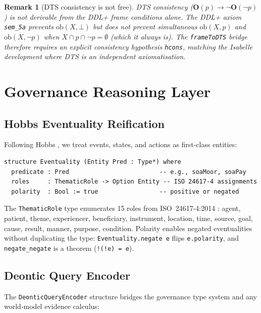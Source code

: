 \documentclass[]{article}
\newtheorem{remark}[theorem]{Remark}
\newcommand{\code}[1]{\texttt{#1}}
\newcommand{\OB}{\ensuremath{\mathbf{O}}}
\newcommand{\DDL}{\textup{DDL+}}
\newcommand{\DTS}{\textup{DTS}}
\begin{document}
\begin{remark}[DTS consistency is not free]
\DTS{} consistency ($\OB(p) \to \neg\OB(\neg p)$) is \emph{not} derivable
from the \DDL{} frame conditions alone.  The \DDL{} axiom \code{sem\_5a}
prevents $\text{ob}(X, \bot)$ but does \emph{not} prevent simultaneous
$\text{ob}(X, p)$ and $\text{ob}(X, \neg p)$ when $X \cap p \cap \neg p = \emptyset$
(which it always is).  The \code{frameToDTS} bridge therefore requires an
explicit consistency hypothesis \code{hcons}, matching the Isabelle development
where \DTS{} is an independent axiomatisation.
\end{remark}

\section{Governance Reasoning Layer}
\label{sec:govlayer}

\subsection{Hobbs Eventuality Reification}

Following Hobbs \cite{Hobbs1985}, we treat events, states, and actions as
first-class entities:

\begin{lstlisting}
structure Eventuality (Entity Pred : Type*) where
  predicate : Pred                         -- e.g., soaMoor, soaPay
  roles     : ThematicRole -> Option Entity -- ISO 24617-4 assignments
  polarity  : Bool := true                 -- positive or negated
\end{lstlisting}

\noindent
The \code{ThematicRole} type enumerates 15 roles from ISO~24617-4:2014
\cite{ISO246174}: agent, patient, theme, experiencer, beneficiary, instrument,
location, time, source, goal, cause, result, manner, purpose, condition.
Polarity enables negated eventualities without duplicating the type:
\code{Eventuality.negate e} flips \code{e.polarity}, and
\code{negate\_negate} is a theorem (\code{!(!e) = e}).

\subsection{Deontic Query Encoder}

The \code{DeonticQueryEncoder} structure bridges the governance type system
and any world-model evidence calculus:
\end{document}
